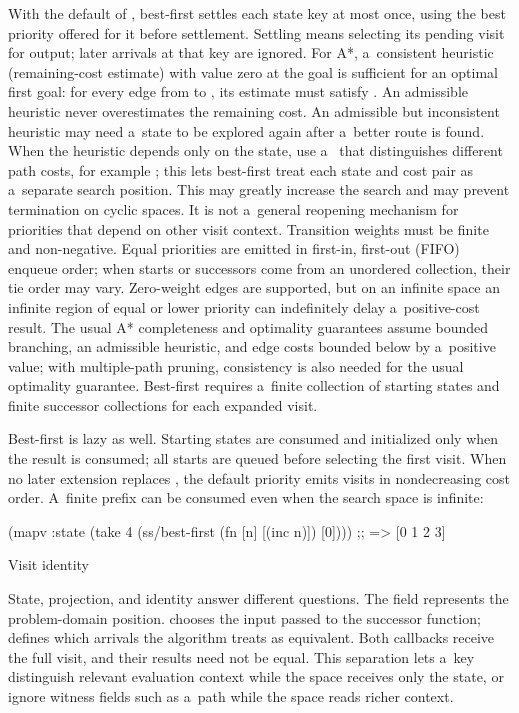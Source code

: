 With the default  of , best-first settles each
state key at most once, using the best priority offered for it before
settlement. Settling means selecting its pending visit for output; later
arrivals at that key are ignored. For A*, a~consistent heuristic (remaining-cost
estimate) with value zero at the goal is
sufficient for an optimal first goal: for every edge from  to
, its estimate must satisfy .
An admissible heuristic never overestimates the remaining cost.
An admissible but inconsistent heuristic may
need a~state to be explored again after a~better route is found. When the
heuristic depends only on the state, use a~ that distinguishes
different path costs, for example ; this lets
best-first treat each state and cost pair as a~separate search position.
This may greatly increase the search and may prevent termination on cyclic
spaces. It is not a~general reopening mechanism for priorities that depend on
other visit context. Transition weights must be finite and non-negative.
Equal priorities are emitted in first-in, first-out (FIFO) enqueue order; when starts or
successors come from an unordered collection, their tie order may vary.
Zero-weight edges are supported, but on an infinite space an infinite region
of equal or lower priority can indefinitely delay a~positive-cost result.
The usual A* completeness and optimality guarantees assume bounded branching,
an admissible heuristic, and edge costs bounded below by a~positive value;
with multiple-path pruning, consistency is also needed for the usual
optimality guarantee.
Best-first requires a~finite collection of starting states and finite
successor collections for each expanded visit.

Best-first is lazy as well. Starting states are consumed and initialized
only when the result is consumed; all starts are queued before selecting
the first visit. When no later extension replaces , the
default priority emits visits in nondecreasing cost order. A~finite prefix
can be consumed even when the search space is infinite:

\begtt {}
(mapv :state
      (take 4 (ss/best-first (fn [n] [(inc n)]) [0])))
;; => [0 1 2 3]
\endtt

\secc[identity] Visit identity

State, projection, and identity answer different questions. The
 field represents the problem-domain position.
 chooses the input passed to the successor function;
 defines which arrivals the algorithm treats as equivalent.
Both callbacks receive the full visit, and their results need not be equal.
This separation lets a~key distinguish relevant evaluation context while
the space receives only the state, or ignore witness fields such as a~path
while the space reads richer context.

